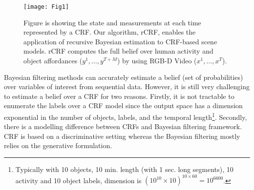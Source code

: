 




\begin{figure}[t]
\texttt{[image: Fig1]}
\caption{Figure is showing the state and measurements at each time represented by a CRF.
Our algorithm, rCRF, enables the application of recursive Bayesian estimation to CRF-based scene models. rCRF computes the full belief over human activity and object affordances ($y^1,\ldots,y^{T+M}$) by using RGB-D Video ($x^1,\ldots,x^T$).}
\vspace{-5mm}
\label{fig1}
\end{figure}

Bayesian filtering methods can accurately estimate a belief (set of probabilities) over variables of interest from sequential data. However, it is still very challenging to estimate a belief over a CRF for two reasons. Firstly, it is not tractable to enumerate the labels over a CRF model since the output space has a dimension exponential in the number of objects, labels, and the temporal length\footnote{Typically with 10 objects, 10 min. length (with 1 sec. long segments), 10 activity and 10 object labels, dimension is $(10^{10}\times10)^{10\times60}=10^{6600}$.}. Secondly, there is a modelling difference between CRFs and Bayesian filtering framework. CRF is based on a discriminative setting whereas the Bayesian filtering mostly relies on the generative formulation.

